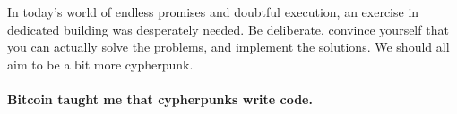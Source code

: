 In today's world of endless promises and doubtful execution, an exercise
in dedicated building was desperately needed. Be deliberate, convince
yourself that you can actually solve the problems, and implement the
solutions. We should all aim to be a bit more cypherpunk.

\paragraph{Bitcoin taught me that cypherpunks write code.}

%
%
%
%
